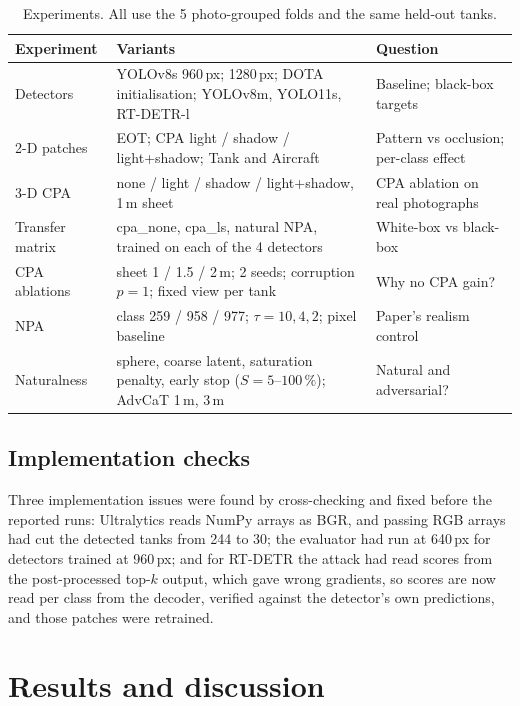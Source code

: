 \documentclass[11pt,a4paper]{article}
\begin{document}
\begin{table}[htbp]
\centering\small
\caption{Experiments. All use the 5 photo-grouped folds and the same held-out tanks.}
\label{tab:experiments}
\begin{tabularx}{\linewidth}{@{}p{3.1cm}Yp{4.3cm}@{}}
\toprule
Experiment & Variants & Question \\
\midrule
Detectors & YOLOv8s 960\,px; 1280\,px; DOTA initialisation; YOLOv8m, YOLO11s, RT-DETR-l & Baseline; black-box targets \\
2-D patches & EOT; CPA light / shadow / light+shadow; Tank and Aircraft & Pattern vs occlusion; per-class effect \\
3-D CPA & none / light / shadow / light+shadow, 1\,m sheet & CPA ablation on real photographs \\
Transfer matrix & cpa\_none, cpa\_ls, natural NPA, trained on each of the 4 detectors & White-box vs black-box \\
CPA ablations & sheet 1 / 1.5 / 2\,m; 2 seeds; corruption $p=1$; fixed view per tank & Why no CPA gain? \\
NPA & class 259 / 958 / 977; $\tau=10,4,2$; pixel baseline & Paper's realism control \\
Naturalness & sphere, coarse latent, saturation penalty, early stop ($S=5$--$100\,\%$); AdvCaT 1\,m, 3\,m & Natural and adversarial? \\
\bottomrule
\end{tabularx}
\end{table}

\subsection{Implementation checks}
Three implementation issues were found by cross-checking and fixed before the reported runs: Ultralytics reads NumPy arrays as BGR, and passing RGB arrays had cut the detected tanks from 244 to 30; the evaluator had run at 640\,px for detectors trained at 960\,px; and for RT-DETR the attack had read scores from the post-processed top-$k$ output, which gave wrong gradients, so scores are now read per class from the decoder, verified against the detector's own predictions, and those patches were retrained.

\section{Results and discussion}\label{sec:results}
\end{document}
